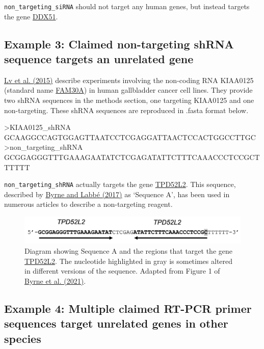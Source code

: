 \documentclass[letterpaper, 12pt]{article}
\begin{document}
\verb|non_targeting_siRNA| should not target any human genes, but instead targets the gene \href{https://www.ncbi.nlm.nih.gov/gene/317781}{DDX51}.

\pagebreak

\subsection*{Example 3: Claimed non-targeting shRNA sequence targets an unrelated gene}

\href{https://doi.org/10.1155/2015/108458}{Lv et al. (2015)} describe experiments involving the non-coding RNA KIAA0125 (standard name \href{https://www.ncbi.nlm.nih.gov/gene/9834}{FAM30A}) in human gallbladder cancer cell lines. They provide two shRNA sequences in the methods section, one targeting KIAA0125 and one non-targeting. These shRNA sequences are reproduced in .fasta format below.

\begin{verbatim*}
>KIAA0125_shRNA
GCAAGGCCAGTGGAGTTAATCCTCGAGGATTAACTCCACTGGCCTTGC
>non_targeting_shRNA
GCGGAGGGTTTGAAAGAATATCTCGAGATATTCTTTCAAACCCTCCGCTTTTTT
\end{verbatim*}

\verb|non_targeting_shRNA| actually targets the gene \href{https://www.ncbi.nlm.nih.gov/gene/7165}{TPD52L2}. This sequence, described by \href{https://doi.org/10.1007/s11192-016-2209-6}{Byrne and Labb\'e (2017)} as `Sequence A', has been used in numerous articles to describe a non-targeting reagent.

\begin{figure}[h!tbp]
    \centering
    \includegraphics[width=\textwidth]{img/nucleotide_sequences/Screenshot 2025-04-03 at 13-21-09 11192_2021_3871_Fig1_HTML.png}
    \caption*{Diagram showing Sequence A and the regions that target the gene \href{https://www.ncbi.nlm.nih.gov/gene/7165}{TPD52L2}. The nucleotide highlighted in gray is sometimes altered in different versions of the sequence. Adapted from Figure 1 of \href{https://doi.org/10.1007/s11192-021-03871-9}{Byrne et al. (2021)}.}
\end{figure}

\subsection*{Example 4: Multiple claimed RT-PCR primer sequences target unrelated genes in other species}
\end{document}
